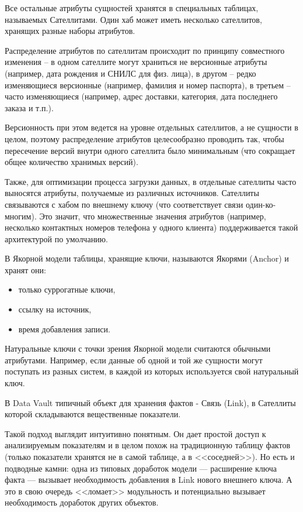 \documentclass[%
	11pt,
	a4paper,
	utf8,
		]{article}
\begin{document}
Все остальные атрибуты сущностей хранятся в специальных таблицах, называемых Сателлитами. Один хаб может иметь несколько сателлитов, хранящих разные наборы атрибутов.

Распределение атрибутов по сателлитам происходит по принципу совместного изменения -- в одном сателлите могут храниться не версионные атрибуты (например, дата рождения и СНИЛС для физ. лица), в другом -- редко изменяющиеся версионные (например, фамилия и номер паспорта), в третьем -- часто изменяющиеся (например, адрес доставки, категория, дата последнего заказа и т.п.).

Версионность при этом ведется на уровне отдельных сателлитов, а не сущности в целом, поэтому распределение атрибутов целесообразно проводить так, чтобы пересечение версий внутри одного сателлита было минимальным (что сокращает общее количество хранимых версий).

Также, для оптимизации процесса загрузки данных, в отдельные сателлиты часто выносятся атрибуты, получаемые из различных источников. Сателлиты связываются с хабом по внешнему ключу (что соответствует связи один-ко-многим). Это значит, что множественные значения атрибутов (например, несколько контактных номеров телефона у одного клиента) поддерживается такой архитектурой по умолчанию.

В Якорной модели таблицы, хранящие ключи, называются Якорями (Anchor) и хранят они:
\begin{itemize}
	\item только суррогатные ключи,
	
	\item ссылку на источник,
	
	\item время добавления записи.
\end{itemize}

Натуральные ключи с точки зрения Якорной модели считаются обычными атрибутами. Например, если данные об одной и той же сущности могут поступать из разных систем, в каждой из которых используется свой натуральный ключ. 

В Data Vault типичный объект для хранения фактов - Связь (Link), в Сателлиты которой складываются вещественные показатели.

Такой подход выглядит интуитивно понятным. Он дает простой доступ к анализируемым показателям и в целом похож на традиционную таблицу фактов (только показатели хранятся не в самой таблице, а в <<соседней>>). Но есть и подводные камни: одна из типовых доработок модели — расширение ключа факта — вызывает необходимость добавления в Link нового внешнего ключа. А это в свою очередь <<ломает>> модульность и потенциально вызывает необходимость доработок других объектов.
\end{document}
